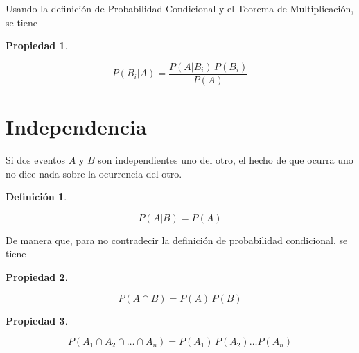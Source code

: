 \documentclass[a5paper,12pt,twoside]{book}
\newtheorem{defn}{{Definición}}[chapter]
\newtheorem{prop}{{Propiedad}}[chapter]
\begin{document}
Usando la definición de Probabilidad Condicional y el Teorema de Multiplicación, se tiene

\begin{mdframed}[style=PropertyFrame]
    \begin{prop}
    \end{prop}
    \begin{equation*}
        P(B_i|A) = \frac{P(A|B_i) \, P(B_i)}{P(A)}
    \end{equation*}
\end{mdframed}


\section{Independencia}

Si dos eventos $A$ y $B$ son independientes uno del otro, el hecho de que ocurra uno no dice nada sobre la ocurrencia del otro.

\begin{mdframed}[style=DefinitionFrame]
    \begin{defn}
    \end{defn}
    \begin{equation*}
        P(A|B) = P(A)
    \end{equation*}
\end{mdframed}

De manera que, para no contradecir la definición de probabilidad condicional, se tiene

\begin{mdframed}[style=PropertyFrame]
    \begin{prop}
    \end{prop}
    \begin{equation*}
        P(A \cap B) = P(A) \, P(B)
    \end{equation*}
\end{mdframed}

\begin{mdframed}[style=PropertyFrame]
    \begin{prop}
    \end{prop}
    \begin{equation*}
        P(A_1 \cap A_2 \cap \dots \cap A_n) = P(A_1) \, P(A_2) \dots P(A_n)
    \end{equation*}
\end{mdframed}
\end{document}
